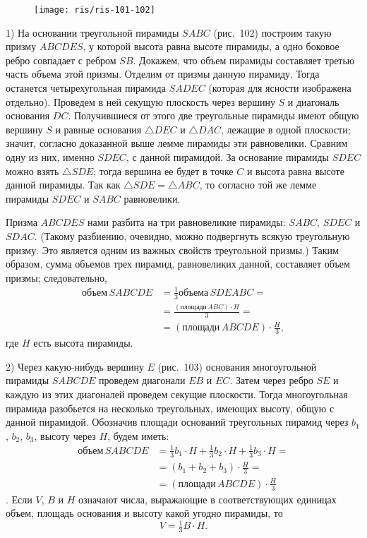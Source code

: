 \documentclass[twoside]{book}
\begin{document}
\begin{figure}[h!]
\centering
\texttt{[image: ris/ris-101-102]}
\caption{}
\end{figure}

1) На основании треугольной пирамиды $SABC$ (рис.~102) построим такую призму $ABCDES$, у которой высота равна высоте пирамиды, а одно боковое ребро совпадает с ребром $SB$.
Докажем, что объем пирамиды составляет третью часть объема этой призмы.
Отделим от призмы данную пирамиду.
Тогда останется четырехугольная пирамида $SADEC$ (которая для ясности изображена отдельно).
Проведем в ней секущую плоскость через вершину $S$ и диагональ основания $DC$.
Получившиеся от этого две треугольные пирамиды имеют общую вершину $S$ и равные основания $\triangle DEC$ и $\triangle DAC$, лежащие в одной плоскости;
значит, согласно доказанной выше лемме пирамиды эти равновелики.
Сравним одну из них, именно $SDEC$, с данной пирамидой.
За основание пирамиды $SDEC$ можно взять $\triangle SDE$;
тогда вершина ее будет в точке $C$ и высота равна высоте данной пирамиды.
Так как $\triangle SDE=\triangle ABC$, то согласно той же лемме пирамиды $SDEC$ и $SABC$ равновелики.

Призма $ABCDES$ нами разбита на три равновеликие пирамиды: $SABC$, $SDEC$ и $SDAC$.
(Такому разбиению, очевидно, можно подвергнуть всякую треугольную призму.
Это является одним из важных свойств треугольной призмы.) Таким образом, сумма объемов трех пирамид, равновеликих данной, составляет объем призмы;
следовательно,
\begin{align*}
\text{объем}\,SABCDE &= \frac13 \text{объема}\, SDEABC =
\\
&=\frac{(\text{площади}\,ABC)\cdot H}3=
\\
&=(\text{площади}\,ABCDE)\cdot \frac{H}3,
\end{align*}
где $H$ есть высота пирамиды.

2) Через какую-нибудь вершину $E$ (рис.~103) основания многоугольной пирамиды $SABCDE$ проведем диагонали $EB$ и $EC$.
Затем через ребро $SE$ и каждую из этих диагоналей проведем секущие плоскости.
Тогда многоугольная пирамида разобьется на несколько треугольных, имеющих высоту, общую с данной пирамидой.
Обозначив площади оснований треугольных пирамид через $b_1$, $b_2$, $b_3$, высоту через $H$, будем иметь:
\begin{align*}
\text{объем}\,SABCDE &= \tfrac13b_1\cdot H + \tfrac13b_2\cdot H + \tfrac13b_3 \cdot H =
\\
&=(b_1+b_2+b_3)\cdot \frac H3=
\\
&=(\text{площади}\,ABCDE)\cdot \frac H3
\end{align*}
.
Если $V$, $B$ и $H$ означают числа, выражающие в соответствующих единицах объем, площадь основания и высоту какой угодно пирамиды, то
\[V = \tfrac13 B\cdot H.\]
\end{document}
